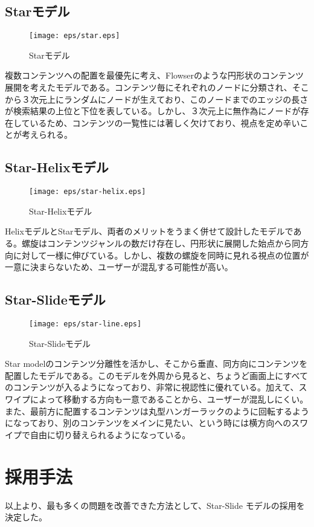 \subsection{Starモデル}
\begin{figure}[htbp]
\begin{center}
\texttt{[image: eps/star.eps]}
\caption{Starモデル}
\label{star}
\end{center}
\end{figure}
複数コンテンツへの配置を最優先に考え、Flowserのような円形状のコンテンツ展開を考えたモデルである。コンテンツ毎にそれぞれのノードに分類され、そこから３次元上にランダムにノードが生えており、このノードまでのエッジの長さが検索結果の上位と下位を表している。しかし、３次元上に無作為にノードが存在しているため、コンテンツの一覧性には著しく欠けており、視点を定め辛いことが考えられる。

\subsection{Star-Helixモデル}
\begin{figure}[htbp]
\begin{center}
\texttt{[image: eps/star-helix.eps]}
\caption{Star-Helixモデル}
\label{star-helix}
\end{center}
\end{figure}
HelixモデルとStarモデル、両者のメリットをうまく併せて設計したモデルである。螺旋はコンテンツジャンルの数だけ存在し、円形状に展開した始点から同方向に対して一様に伸びている。しかし、複数の螺旋を同時に見れる視点の位置が一意に決まらないため、ユーザーが混乱する可能性が高い。

\subsection{Star-Slideモデル}
\begin{figure}[htbp]
\begin{center}
\texttt{[image: eps/star-line.eps]}
\caption{Star-Slideモデル}
\label{star-line}
\end{center}
\end{figure}
Star modelのコンテンツ分離性を活かし、そこから垂直、同方向にコンテンツを配置したモデルである。このモデルを外周から見ると、ちょうど画面上にすべてのコンテンツが入るようになっており、非常に視認性に優れている。加えて、スワイプによって移動する方向も一意であることから、ユーザーが混乱しにくい。また、最前方に配置するコンテンツは丸型ハンガーラックのように回転するようになっており、別のコンテンツをメインに見たい、という時には横方向へのスワイプで自由に切り替えられるようになっている。

\section{採用手法}
以上より、最も多くの問題を改善できた方法として、Star-Slide モデルの採用を決定した。